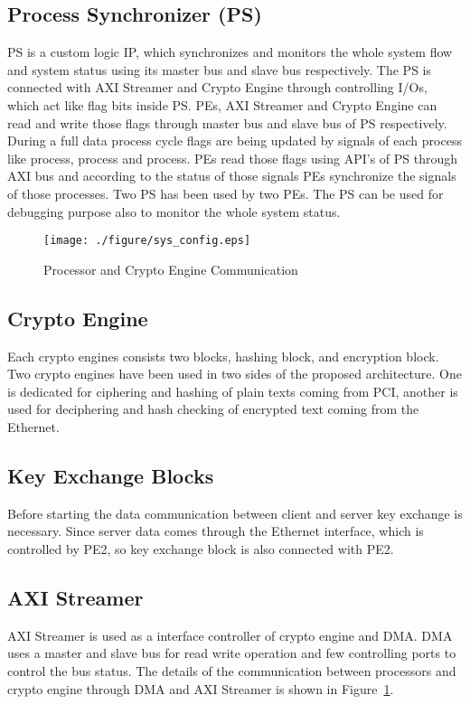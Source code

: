 \documentclass[3p,times]{elsarticle}
\begin{document}
\subsection{Process  Synchronizer (PS)}
PS is a custom logic IP, which synchronizes and monitors the whole system flow and system status using its master bus and slave bus respectively. The PS is connected with AXI Streamer and Crypto Engine through controlling I/Os, which act like flag bits inside PS.
PEs, AXI Streamer and Crypto Engine can read and write those flags through master bus and slave bus of PS respectively. During a full data process cycle flags are being updated by  signals of each process like  process,  process and  process. PEs read those  flags using API's of PS through AXI bus and according to the status of those  signals PEs synchronize the  signals of those processes. Two PS has been used by two PEs. The PS can be used for debugging purpose also to monitor the whole system status.



\begin{figure}[!hp]
\centering
\texttt{[image: ./figure/sys\_config.eps]}
\vspace{-6pt}
\caption{Processor and Crypto Engine Communication}
\vspace{-8pt}
\label{fig:sys_config_fig}
\end{figure}
\subsection{Crypto Engine}
Each crypto engines consists two blocks, hashing block, and encryption block. Two crypto engines have been used in two sides of the proposed architecture. One is dedicated for ciphering and hashing of plain texts coming from PCI, another is used for deciphering and hash checking of encrypted text coming from the Ethernet. 
\vspace{-10pt}
\subsection{Key Exchange Blocks}
Before starting the data communication between client and server key exchange is necessary. Since server data comes through the Ethernet interface, which is controlled by PE2, so key exchange block is also connected with PE2.
\vspace{-10pt}
\subsection{AXI Streamer}
AXI Streamer is used as a interface controller of crypto engine and DMA. DMA uses a master and slave bus for read write operation and few controlling ports to control the bus status. The details of the communication between processors and crypto engine through DMA and AXI Streamer is shown in Figure~\ref{fig:sys_config_fig}.\\  
\vspace{-10pt}
\end{document}

